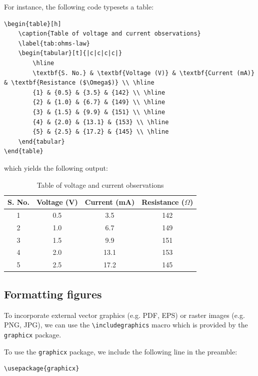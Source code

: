 		For instance, the following code typesets a table:
\begin{lstlisting}
\begin{table}[h]
	\caption{Table of voltage and current observations}
	\label{tab:ohms-law}
	\begin{tabular}[t]{|c|c|c|c|}
		\hline
		\textbf{S. No.} & \textbf{Voltage (V)} & \textbf{Current (mA)} & \textbf{Resistance ($\Omega$)} \\ \hline
		{1} & {0.5} & {3.5} & {142} \\ \hline
		{2} & {1.0} & {6.7} & {149} \\ \hline
		{3} & {1.5} & {9.9} & {151} \\ \hline
		{4} & {2.0} & {13.1} & {153} \\ \hline
		{5} & {2.5} & {17.2} & {145} \\ \hline
	\end{tabular}
\end{table}
\end{lstlisting}
		which yields the following output:
		\begin{table}[h]
			\centering
			\caption{Table of voltage and current observations}
			\label{tab:ohms-law}
			\begin{tabular}[t]{|c|c|c|c|}
				\hline
				\textbf{S. No.} & \textbf{Voltage (V)} & \textbf{Current (mA)} & \textbf{Resistance ($\Omega$)} \\ \hline
				{1} & {0.5} & {3.5} & {142} \\ \hline
				{2} & {1.0} & {6.7} & {149} \\ \hline
				{3} & {1.5} & {9.9} & {151} \\ \hline
				{4} & {2.0} & {13.1} & {153} \\ \hline
				{5} & {2.5} & {17.2} & {145} \\ \hline
			\end{tabular}
		\end{table}
	
	\newpage
	\subsection{Formatting figures}
		To incorporate external vector graphics (e.g. PDF, EPS) or raster images (e.g. PNG, JPG), we can use the \lstinline|\includegraphics| macro which is provided by the \lstinline|graphicx| package.
		
		To use the \lstinline|graphicx| package, we include the following line in the preamble:
\begin{lstlisting}
\usepackage{graphicx}
\end{lstlisting}
		
